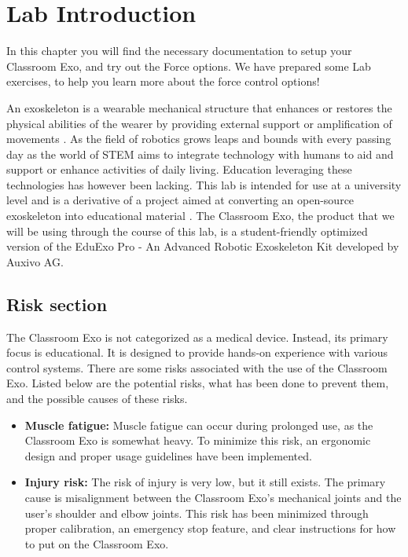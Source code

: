 

\section{Lab Introduction}

\begin{tcolorbox}[colback=blue!5!white,colframe=blue!75!black,title=Summary]
	In this chapter you will find the necessary documentation to setup your Classroom Exo, and try out the Force options. We have prepared some Lab exercises, to help you learn more about the force control options!
\end{tcolorbox}
\vspace{0.5cm}

An exoskeleton is a wearable mechanical structure that enhances or restores the physical abilities of the wearer by providing external support or amplification of movements \cite{AlTashi2024}. As the field of robotics grows leaps and bounds with every passing day as the world of STEM aims to integrate technology with humans to aid and support or enhance activities of daily living. Education leveraging these technologies has however been lacking. 
This lab is intended for use at a university level and is a derivative of a project aimed at converting an open-source exoskeleton into educational material \cite{AlTashi2024}. The Classroom Exo, the product that we will be using through the course of this lab, is a student-friendly optimized version of the EduExo Pro - An Advanced Robotic Exoskeleton Kit developed by Auxivo AG. 

\subsection{Risk section}
The Classroom Exo is not categorized as a medical device. Instead, its primary focus is educational. It is designed to provide hands-on experience with various control systems. There are some risks associated with the use of the Classroom Exo. Listed below are the potential risks, what has been done to prevent them, and the possible causes of these risks.
\begin{itemize}[]
	\item \textbf{Muscle fatigue:} Muscle fatigue can occur during prolonged use, as the Classroom Exo is somewhat heavy. To minimize this risk, an ergonomic design and proper usage guidelines have been implemented.
	\item \textbf{Injury risk:} The risk of injury is very low, but it still exists. The primary cause is misalignment between the Classroom Exo's mechanical joints and the user's shoulder and elbow joints. This risk has been minimized through proper calibration, an emergency stop feature, and clear instructions for how to put on the Classroom Exo.
\end{itemize}

